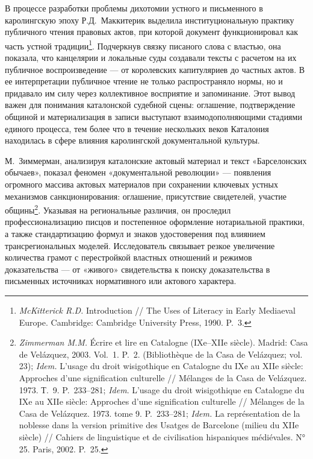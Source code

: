 В процессе разработки проблемы дихотомии устного и письменного в каролингскую эпоху Р.Д.~Маккитерик выделила институциональную практику публичного чтения правовых актов, при которой документ функционировал как часть устной традиции\footnote{\emph{McKitterick R.D.} Introduction // The Uses of Literacy in Early Mediaeval Europe. Cambridge: Cambridge University Press, 1990. P.~3.}. Подчеркнув связку писаного слова с властью, она показала, что канцелярии и локальные суды создавали тексты с расчетом на их публичное воспроизведение --- от королевских капитуляриев до частных актов. В ее интерпретации публичное чтение не только распространяло нормы, но и придавало им силу через коллективное восприятие и запоминание. Этот вывод важен для понимания каталонской судебной сцены: оглашение, подтверждение общиной и материализация в записи выступают взаимодополняющими стадиями единого процесса, тем более что в течение нескольких веков Каталония находилась в сфере влияния каролингской документальной культуры.

М.~Зиммерман, анализируя каталонские актовый материал и текст «Барселонских обычаев», показал феномен «документальной революции» --- появления огромного массива актовых материалов при сохранении ключевых устных механизмов санкционирования: оглашение, присутствие свидетелей, участие общины\footnote{\emph{Zimmerman M.M. }Écrire et lire en Catalogne (IXe--XIIe siècle). Madrid: Casa de Velázquez, 2003. Vol.~1. P.~2. (Bibliothèque de la Casa de Velázquez; vol. 23); \emph{Idem.} L’usage du droit wisigothique en Catalogne du IXe au XIIe siècle: Approches d'une signification culturelle // Mélanges de la Casa de Velázquez. 1973. Т.~9. P.~233--281; \emph{Idem}. L’usage du droit wisigothique en Catalogne du IXe au XIIe siècle: Approches d'une signification culturelle // Mélanges de la Casa de Velázquez. 1973. tome 9. P.~233--281; \emph{Idem.} La représentation de la noblesse dans la version primitive des Usatges de Barcelone (milieu du XIIe siècle) // Cahiers de linguistique et de civilisation hispaniques médiévales. N° 25. Paris, 2002. P.~25.}. Указывая на региональные различия, он проследил профессионализацию писцов и постепенное оформление нотариальной практики, а также стандартизацию формул и знаков удостоверения под влиянием трансрегиональных моделей. Исследователь связывает резкое увеличение количества грамот с перестройкой властных отношений и режимов доказательства --- от «живого» свидетельства к поиску доказательства в письменных источниках нормативного или актового характера.

